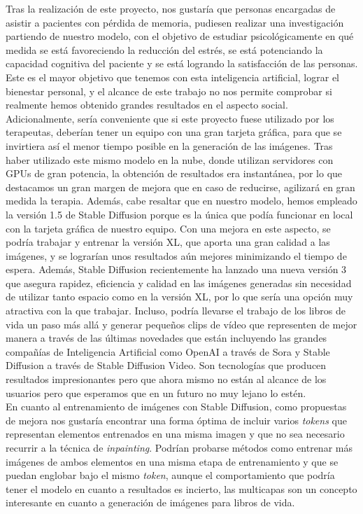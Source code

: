 Tras la realización de este proyecto, nos gustaría que personas encargadas de asistir a pacientes con pérdida de memoria, pudiesen realizar una investigación partiendo de nuestro modelo, con el objetivo de estudiar psicológicamente en qué medida se está favoreciendo la reducción del estrés, se está potenciando la capacidad cognitiva del paciente y se está logrando la satisfacción de las personas. Este es el mayor objetivo que tenemos con esta inteligencia artificial, lograr el bienestar personal, y el alcance de este trabajo no nos permite comprobar si realmente hemos obtenido grandes resultados en el aspecto social.\\

Adicionalmente, sería conveniente que si este proyecto fuese utilizado por los terapeutas, deberían tener un equipo con una gran tarjeta gráfica, para que se invirtiera así el menor tiempo posible en la generación de las imágenes. Tras haber utilizado este mismo modelo en la nube, donde utilizan servidores con GPUs de gran potencia, la obtención de resultados era instantánea, por lo que destacamos un gran margen de mejora que en caso de reducirse, agilizará en gran medida la terapia. Además, cabe resaltar que en nuestro modelo, hemos empleado la versión 1.5 de Stable Diffusion porque es la única que podía funcionar en local con la tarjeta gráfica de nuestro equipo. Con una mejora en este aspecto, se podría trabajar y entrenar la versión XL, que aporta una gran calidad a las imágenes, y se lograrían unos resultados aún mejores minimizando el tiempo de espera.  Además, Stable Diffusion recientemente ha lanzado una nueva versión 3 que asegura rapidez, eficiencia y calidad en las imágenes generadas sin necesidad de utilizar tanto espacio como en la versión XL, por lo que sería una opción muy atractiva con la que trabajar. Incluso, podría llevarse el trabajo de los libros de vida un paso más allá y generar pequeños clips de vídeo que representen de mejor manera a través de las últimas novedades que están incluyendo las grandes compañías de Inteligencia Artificial como OpenAI a través de Sora y Stable Diffusion a través de Stable Diffusion Video. Son tecnologías que producen resultados impresionantes pero que ahora mismo no están al alcance de los usuarios pero que esperamos que en un futuro no muy lejano lo estén. \\

En cuanto al entrenamiento de imágenes con Stable Diffusion, como propuestas de mejora nos gustaría encontrar una forma óptima de incluir varios \textit{tokens} que representan elementos entrenados en una misma imagen y que no sea necesario recurrir a la técnica de \textit{inpainting}. Podrían probarse métodos como entrenar más imágenes de ambos elementos en una misma etapa de entrenamiento y que se puedan englobar bajo el mismo \textit{token}, aunque el comportamiento que podría tener el modelo en cuanto a resultados es incierto, las multicapas son un concepto interesante en cuanto a generación de imágenes para libros de vida. \\


